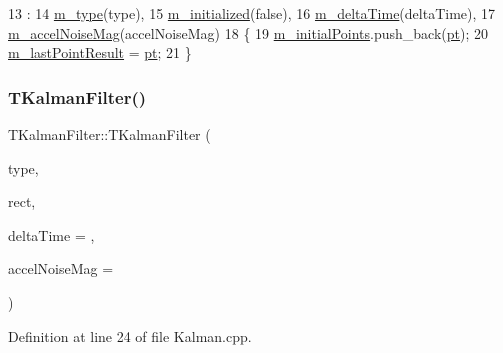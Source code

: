 \begin{DoxyCode}
13     :
14       \mbox{\hyperlink{class_t_kalman_filter_a00cabc6683f6cc848559515df46d7101}{m\_type}}(type),
15       \mbox{\hyperlink{class_t_kalman_filter_a5633e302e878261c8669816695f6a314}{m\_initialized}}(\textcolor{keyword}{false}),
16       \mbox{\hyperlink{class_t_kalman_filter_a7335e3bd7a695ebaf5eaa93c42e39eae}{m\_deltaTime}}(deltaTime),
17       \mbox{\hyperlink{class_t_kalman_filter_a9f511e8885e5e89643fa6d59ea7bbd27}{m\_accelNoiseMag}}(accelNoiseMag)
18 \{
19     \mbox{\hyperlink{class_t_kalman_filter_a5c4fc5a43ce0798dbe80f76f8aae2fc9}{m\_initialPoints}}.push\_back(\mbox{\hyperlink{rings_8cpp_af69bbacaaf68a115b351c5d1e29c3cc8}{pt}});
20     \mbox{\hyperlink{class_t_kalman_filter_a91efb6a00cfae5df3e513ceba2239fa3}{m\_lastPointResult}} = \mbox{\hyperlink{rings_8cpp_af69bbacaaf68a115b351c5d1e29c3cc8}{pt}};
21 \}
\end{DoxyCode}
\mbox{\label{class_t_kalman_filter_aee7dc25f9fc4e72f627068ab0b56fd75}} 
\subsubsection{\texorpdfstring{T\+Kalman\+Filter()}{TKalmanFilter()}\hspace{0.1cm}{\footnotesize\ttfamily [2/2]}}
{\footnotesize\ttfamily T\+Kalman\+Filter\+::\+T\+Kalman\+Filter (\begin{DoxyParamCaption}\item[{\mbox{\hyperlink{namespacetracking_a83f2c4d58ea2737f7d6296dce3eb722a}{tracking\+::\+Kalman\+Type}}}]{type,  }\item[{cv\+::\+Rect}]{rect,  }\item[{\mbox{\hyperlink{defines_8h_a7ce9c8817b42ab418e61756f579549ab}{track\+\_\+t}}}]{delta\+Time = {},  }\item[{\mbox{\hyperlink{defines_8h_a7ce9c8817b42ab418e61756f579549ab}{track\+\_\+t}}}]{accel\+Noise\+Mag = {} }\end{DoxyParamCaption})}



Definition at line 24 of file Kalman.\+cpp.


